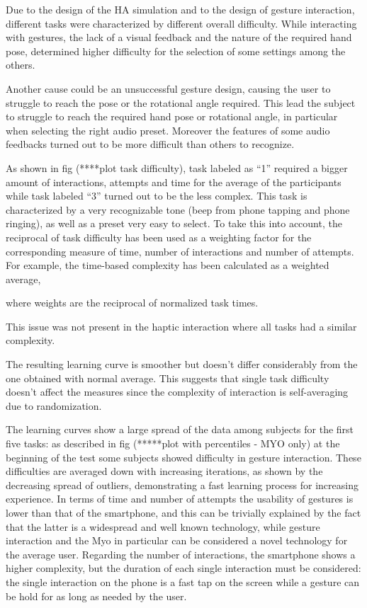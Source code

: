 \documentclass[journal]{./IEEEtran}
\begin{document}
Due to the design of the HA simulation and to the design of gesture interaction, different tasks were characterized by different overall difficulty. While interacting with gestures, the lack of a visual feedback and the nature of the required hand pose, determined higher difficulty for the selection of some settings among the others. 

Another cause could be an unsuccessful gesture design, causing the user to struggle to reach the pose or the rotational angle required. This lead the subject to struggle to reach the required hand pose or rotational angle, in particular when selecting the right audio preset. Moreover the features of some audio feedbacks turned out to be more difficult than others to recognize. 

As shown in fig (****plot task difficulty), task labeled as “1” required a bigger amount of interactions, attempts and time for the average of the participants while task labeled “3” turned out to be the less complex. This task is characterized by a very recognizable tone (beep from phone tapping and phone ringing), as well as a preset very easy to select.
To take this into account, the reciprocal of task difficulty has been used as a weighting factor for the corresponding measure of time, number of interactions and number of attempts. For example, the time-based complexity has been calculated as a weighted average,



where weights are the reciprocal of normalized task times.

This issue was not present in the haptic interaction where all tasks had a similar complexity.

The resulting learning curve is smoother but doesn’t differ considerably from the one obtained with normal average. This suggests that single task difficulty doesn’t affect the measures since the complexity of interaction is self-averaging due to randomization.

The learning curves show a large spread of the data among subjects for the first five tasks: as described in fig (*****plot with percentiles - MYO only) at the beginning of the test some subjects showed difficulty in gesture interaction. These difficulties are averaged down with increasing iterations, as shown by the decreasing spread of outliers, demonstrating a fast learning process for increasing experience. 
In terms of time and number of attempts the usability of gestures is lower than that of the smartphone, and this can be trivially explained by the fact that the latter is a widespread and well known technology, while gesture interaction and the Myo in particular can be considered a novel technology for the average user. Regarding the number of interactions, the smartphone shows a higher complexity, but the duration of each single interaction must be considered: the single interaction on the phone is a fast tap on the screen while a gesture can be hold for as long as needed by the user.
\end{document}
